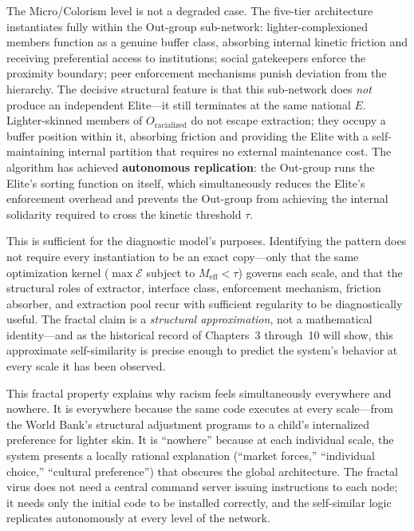 \documentclass[12pt,openany]{book}
\begin{document}
The Micro/Colorism level is not a degraded case. The five-tier architecture instantiates fully within the Out-group sub-network: lighter-complexioned members function as a genuine buffer class, absorbing internal kinetic friction and receiving preferential access to institutions; social gatekeepers enforce the proximity boundary; peer enforcement mechanisms punish deviation from the hierarchy. The decisive structural feature is that this sub-network does \textit{not} produce an independent Elite---it still terminates at the same national $E$. Lighter-skinned members of $O_{\text{racialized}}$ do not escape extraction; they occupy a buffer position within it, absorbing friction and providing the Elite with a self-maintaining internal partition that requires no external maintenance cost. The algorithm has achieved \textbf{autonomous replication}: the Out-group runs the Elite's sorting function on itself, which simultaneously reduces the Elite's enforcement overhead and prevents the Out-group from achieving the internal solidarity required to cross the kinetic threshold $\tau$.

This is sufficient for the diagnostic model's purposes. Identifying the pattern does not require every instantiation to be an exact copy---only that the same optimization kernel ($\max\mathcal{E}$ subject to $M_{\text{eff}}<\tau$) governs each scale, and that the structural roles of extractor, interface class, enforcement mechanism, friction absorber, and extraction pool recur with sufficient regularity to be diagnostically useful. The fractal claim is a \textit{structural approximation}, not a mathematical identity---and as the historical record of Chapters~3 through~10 will show, this approximate self-similarity is precise enough to predict the system's behavior at every scale it has been observed.

This fractal property explains why racism feels simultaneously everywhere and nowhere. It is everywhere because the same code executes at every scale---from the World Bank's structural adjustment programs to a child's internalized preference for lighter skin. It is ``nowhere'' because at each individual scale, the system presents a locally rational explanation (``market forces,'' ``individual choice,'' ``cultural preference'') that obscures the global architecture. The fractal virus does not need a central command server issuing instructions to each node; it needs only the initial code to be installed correctly, and the self-similar logic replicates autonomously at every level of the network.
\end{document}
